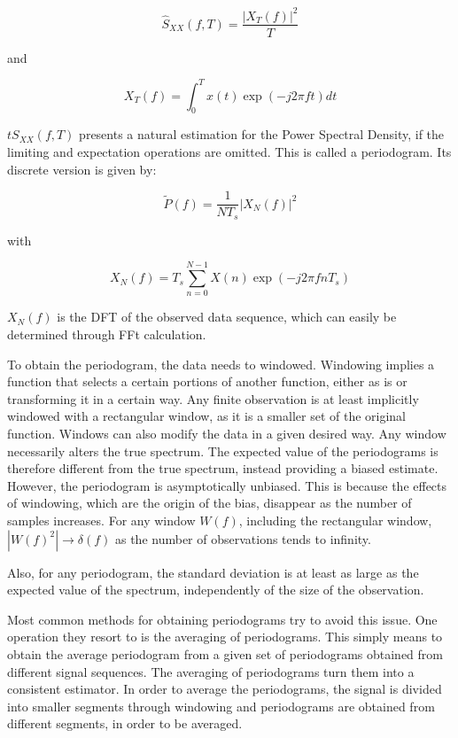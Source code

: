 \begin{refsection}
\begin{equation}
	\hat{S}_{XX}(f,T) = \frac{{| X_T(f)|}^2}{T}
\end{equation}

\noindent and 

\begin{equation}
	X_T(f) = \int_0^T x(t) \exp(-j 2 \pi f t) dt
\end{equation}

$t{S}_{XX}(f,T)$ presents a natural estimation for the Power Spectral Density, if the limiting and
expectation operations are omitted. This is called a periodogram. Its discrete
version is given by:

\begin{equation}
	\tilde{P}\left(f\right)  = \frac{1}{NT_s}{|X_N{\left(f\right)}|}^2
\end{equation}

\noindent with

\begin{equation}
	X_N\left(f\right) = T_s \sum_{n=0}^{N-1} X(n)
	\exp\left(-j2\pi f n T_s \right)
\end{equation}

$X_N(f)$ is the DFT of the observed data sequence, which can easily be
determined through FFt calculation.

To obtain the periodogram, the data needs to windowed. Windowing implies a
function that selects a certain portions of another function, either as is or
transforming it in a certain way.
Any finite observation is at least implicitly windowed with a
rectangular window, as it is a smaller set of the original function. Windows can
also modify the data in a given desired way. Any window necessarily alters the
true spectrum. The expected value of the periodograms is therefore different from the
true spectrum, instead providing a biased estimate. However, the periodogram is
asymptotically unbiased. This is because the effects of windowing, which are the
origin of the bias, disappear as the number of samples increases. For any window
$W(f)$, including the rectangular window, $|W(f)^2| \to
\delta(f)$ as the number of observations tends to infinity.

Also, for any periodogram, the standard deviation is at least as large as the
expected value of the spectrum, independently of the size of the observation.

Most common methods for obtaining periodograms try to avoid this issue.
One operation they resort to is the averaging of periodograms. This simply means
to obtain the average periodogram from a given set of periodograms obtained from
different signal sequences. The averaging of periodograms turn them into a
consistent estimator. In order to average the periodograms, the signal is
divided into smaller segments through windowing and periodograms are obtained
from different segments, in order to be averaged.


\end{refsection}
